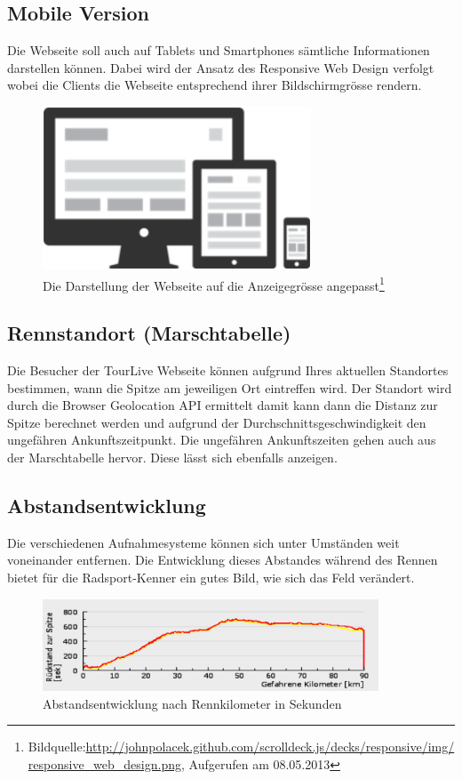 \subsection{Mobile Version}
Die Webseite soll auch auf Tablets und Smartphones sämtliche Informationen darstellen können. Dabei wird der Ansatz des Responsive Web Design verfolgt wobei die Clients die Webseite entsprechend ihrer Bildschirmgrösse rendern.
\begin{figure}[H]
	\centering 
	\includegraphics[width=80mm]{images/tourliveweb/responsive.png}
	\caption{Die Darstellung der Webseite auf die Anzeigegrösse angepasst\footnote{Bildquelle:\url{http://johnpolacek.github.com/scrolldeck.js/decks/responsive/img/responsive_web_design.png}, Aufgerufen am 08.05.2013}}
\end{figure}
\subsection{Rennstandort (Marschtabelle)}
Die Besucher der TourLive Webseite können aufgrund Ihres aktuellen Standortes bestimmen, wann die Spitze am jeweiligen Ort eintreffen wird. Der Standort wird durch die Browser Geolocation API ermittelt damit kann dann die Distanz zur Spitze berechnet werden und aufgrund der Durchschnittsgeschwindigkeit den ungefähren Ankunftszeitpunkt.
Die ungefähren Ankunftszeiten gehen auch aus der Marschtabelle hervor. Diese lässt sich ebenfalls anzeigen.

\subsection{Abstandsentwicklung}
Die verschiedenen Aufnahmesysteme können sich unter Umständen weit voneinander entfernen. Die Entwicklung dieses Abstandes während des Rennen bietet für die Radsport-Kenner ein gutes Bild, wie sich das Feld verändert.
\begin{figure}[H]
	\centering
	\includegraphics[width=100mm]{images/tourliveweb/abstandsentwicklung.png}
	\caption{Abstandsentwicklung nach Rennkilometer in Sekunden}
\end{figure}

